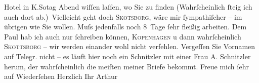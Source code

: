                Hotel in K.So{\geminationn}tag Abend wiſſen laſſen, wo Sie zu
               finden (Wahrſcheinlich ſteig ich {\pb}auch dort
               ab.) Vielleicht geht doch \textsc{Skotsborg}, wäre mir ſympathiſcher – im übrigen wie Sie wollen. Muſs jedenfalls noch
               8 Tage ſehr fleißig arbeiten. Dem Paul hab ich
               auch nur ſchreiben können, \textsc{Kopenhagen} u dann wahrſcheinlich \textsc{Skottsborg} – wir werden einander wohl nicht verfehlen. Vergeſſen Sie Vornamen auf Telegr.
               nicht – es läuft hier noch ein Schnitzler mit
               einer Frau A. Schnitzler herum, der
               wahrſcheinlich die meiſten meiner Briefe bekommt. Freue mich ſehr auf Wiederſehen\pend
           \pstart Herzlich Ihr \spacefill\mbox{Arthur}\pend{}\endnumbering{}  
      